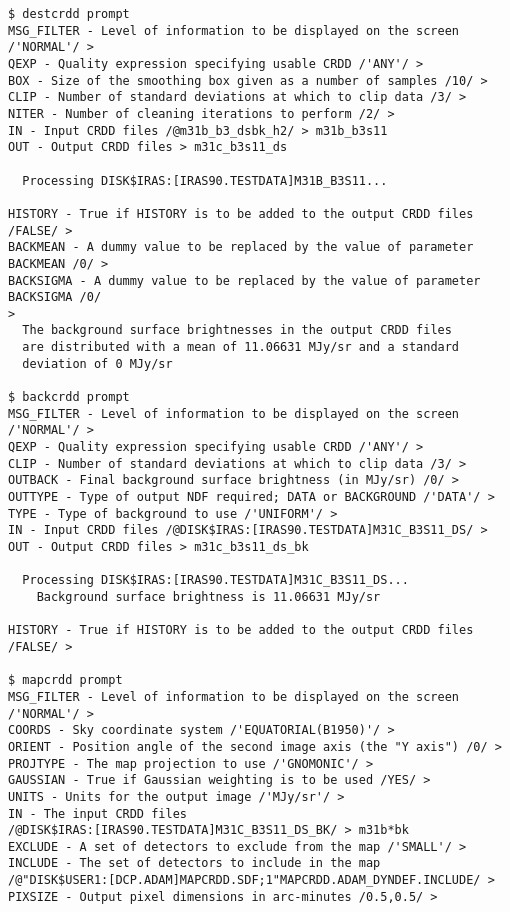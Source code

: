 \begin{small}
\begin{verbatim}
$ destcrdd prompt
MSG_FILTER - Level of information to be displayed on the screen /'NORMAL'/ > 
QEXP - Quality expression specifying usable CRDD /'ANY'/ > 
BOX - Size of the smoothing box given as a number of samples /10/ > 
CLIP - Number of standard deviations at which to clip data /3/ > 
NITER - Number of cleaning iterations to perform /2/ > 
IN - Input CRDD files /@m31b_b3_dsbk_h2/ > m31b_b3s11
OUT - Output CRDD files > m31c_b3s11_ds

  Processing DISK$IRAS:[IRAS90.TESTDATA]M31B_B3S11...

HISTORY - True if HISTORY is to be added to the output CRDD files /FALSE/ > 
BACKMEAN - A dummy value to be replaced by the value of parameter BACKMEAN /0/ >
BACKSIGMA - A dummy value to be replaced by the value of parameter BACKSIGMA /0/
> 
  The background surface brightnesses in the output CRDD files
  are distributed with a mean of 11.06631 MJy/sr and a standard
  deviation of 0 MJy/sr

$ backcrdd prompt
MSG_FILTER - Level of information to be displayed on the screen /'NORMAL'/ > 
QEXP - Quality expression specifying usable CRDD /'ANY'/ > 
CLIP - Number of standard deviations at which to clip data /3/ > 
OUTBACK - Final background surface brightness (in MJy/sr) /0/ > 
OUTTYPE - Type of output NDF required; DATA or BACKGROUND /'DATA'/ > 
TYPE - Type of background to use /'UNIFORM'/ > 
IN - Input CRDD files /@DISK$IRAS:[IRAS90.TESTDATA]M31C_B3S11_DS/ >
OUT - Output CRDD files > m31c_b3s11_ds_bk

  Processing DISK$IRAS:[IRAS90.TESTDATA]M31C_B3S11_DS...
    Background surface brightness is 11.06631 MJy/sr

HISTORY - True if HISTORY is to be added to the output CRDD files /FALSE/ > 

$ mapcrdd prompt
MSG_FILTER - Level of information to be displayed on the screen /'NORMAL'/ > 
COORDS - Sky coordinate system /'EQUATORIAL(B1950)'/ > 
ORIENT - Position angle of the second image axis (the "Y axis") /0/ > 
PROJTYPE - The map projection to use /'GNOMONIC'/ > 
GAUSSIAN - True if Gaussian weighting is to be used /YES/ >
UNITS - Units for the output image /'MJy/sr'/ > 
IN - The input CRDD files
/@DISK$IRAS:[IRAS90.TESTDATA]M31C_B3S11_DS_BK/ > m31b*bk
EXCLUDE - A set of detectors to exclude from the map /'SMALL'/ > 
INCLUDE - The set of detectors to include in the map
/@"DISK$USER1:[DCP.ADAM]MAPCRDD.SDF;1"MAPCRDD.ADAM_DYNDEF.INCLUDE/ >
PIXSIZE - Output pixel dimensions in arc-minutes /0.5,0.5/ > 


\end{verbatim}
\end{small}
